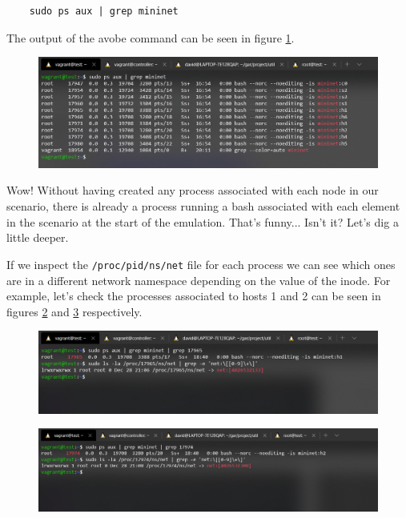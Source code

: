 \documentclass[12pt]{article}
\newcommand{\newpar} {
    \vskip 1cm
}
\begin{document}
			\begin{verbatim}
	sudo ps aux | grep mininet
			\end{verbatim}

			The output of the avobe command can be seen in figure \ref{f:netns_procs}.

			\begin{figure}[!htb]
				\centering
				\includegraphics[width=\linewidth]{netns_procs.png}
				\label{f:netns_procs}
			\end{figure}

			Wow! Without having created any process associated with each node in our scenario, there is already a process running a bash associated with each element in the scenario at the start of the emulation. That's funny... Isn't it? Let's dig a little deeper.
			\newpar
			If we inspect the \texttt{/proc/{pid}/ns/net} file for each process we can see which ones are in a different network namespace depending on the value of the inode. For example, let's check the processes associated to hosts 1 and 2 can be seen in figures \ref{f:host1_procs} and \ref{f:host2_procs} respectively.

			\begin{figure}[!htb]
				\centering
				\includegraphics[width=\linewidth]{host1_procs.png}
				\label{f:host1_procs}
			\end{figure}

			\begin{figure}[!htb]
				\centering
				\includegraphics[width=\linewidth]{host2_procs.png}
				\label{f:host2_procs}
			\end{figure}
\end{document}
